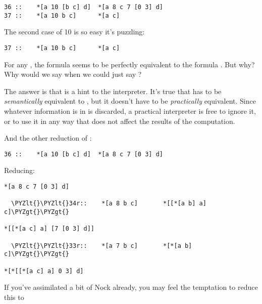 \begin{framed_shaded}
\begin{Verbatim}[fontsize=\relsize{-2.5},fontseries=b,commandchars=\\\{\}]
36 ::    *[a 10 [b c] d]  *[a 8 c 7 [0 3] d]
37 ::    *[a 10 b c]      *[a c]
\end{Verbatim}
\end{framed_shaded}
The second case of 10 is so easy it's puzzling:

\begin{framed_shaded}
\begin{Verbatim}[fontsize=\relsize{-2.5},fontseries=b,commandchars=\\\{\}]
37 ::    *[a 10 b c]      *[a c]
\end{Verbatim}
\end{framed_shaded}
For any , the formula \kode{[10 b c]} seems to be perfectly
equivalent to the formula .  But why?  Why would we say
\kode{[10 b c]} when we could just say ?

The answer is that  is a hint to the interpreter.  It's true
that \kode{[10 b c]} has to be \emph{semantically} equivalent to , but
it doesn't have to be \emph{practically} equivalent.  Since whatever
information is in  is discarded, a practical interpreter is
free to ignore it, or to use it in any way that does not affect
the results of the computation.

And the other reduction of :

\begin{framed_shaded}
\begin{Verbatim}[fontsize=\relsize{-2.5},fontseries=b,commandchars=\\\{\}]
    36 ::    *[a 10 [b c] d]  *[a 8 c 7 [0 3] d]
\end{Verbatim}
\end{framed_shaded}
Reducing:

\begin{framed_shaded}
\begin{Verbatim}[fontsize=\relsize{-2.5},fontseries=b,commandchars=\\\{\}]
*[a 8 c 7 [0 3] d]

  \PYZlt{}\PYZlt{}34r::    *[a 8 b c]       *[[*[a b] a] c]\PYZgt{}\PYZgt{}

*[[*[a c] a] [7 [0 3] d]]

  \PYZlt{}\PYZlt{}33r::    *[a 7 b c]       *[*[a b] c]\PYZgt{}\PYZgt{}

*[*[[*[a c] a] 0 3] d]
\end{Verbatim}
\end{framed_shaded}
If you've assimilated a bit of Nock already, you may feel the
temptation to reduce this to

